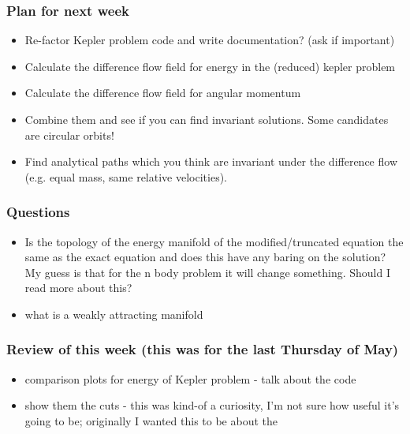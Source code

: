 \documentclass[12pt]{article}
\begin{document}
\subsubsection{Plan for next week}
\begin{itemize}
    \item Re-factor Kepler problem code and write documentation? (ask if important)
    \item Calculate the difference flow field for energy in the (reduced) kepler problem
    \item Calculate the difference flow field for angular momentum
    \item Combine them and see if you can find invariant solutions. Some candidates are circular orbits!
    \item Find analytical paths which you think are invariant under the difference flow (e.g. equal mass, same relative velocities).  
\end{itemize}

\subsubsection{Questions}
\begin{itemize}
    \item Is the topology of the energy manifold of the modified/truncated equation the same as the exact equation and does this have any baring on the solution? My guess is that for the n body problem it will change something. Should I read more about this?
    \item what is a weakly attracting manifold
\end{itemize}



\subsubsection{Review of this week (this was for the last Thursday of May)}
\begin{itemize}
    \item comparison plots for energy of Kepler problem - talk about the code
    \item show them the cuts - this was kind-of a curiosity, I'm not sure how useful it's going to be; originally I wanted this to be about the 
\end{itemize}
\end{document}
